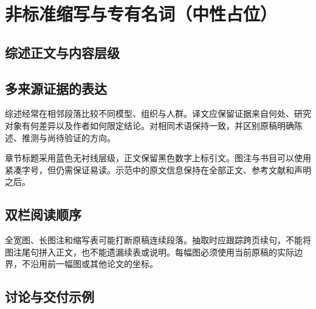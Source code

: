 \documentclass[UTF8,fontset=none,scheme=plain]{ctexart}
\begin{document}
\section*{非标准缩写与专有名词（中性占位）}
\begingroup\setlength{\fboxsep}{8bp}\setlength{\fboxrule}{.5bp}
\noindent{}\endgroup\par\vspace{12bp}
\begin{ahacols}
\section*{综述正文与内容层级}
\AhaBody
\subsection*{多来源证据的表达}
综述经常在相邻段落比较不同模型、组织与人群。译文应保留证据来自何处、研究对象有何差异以及作者如何限定结论。对相同术语保持一致，并区别原稿明确陈述、推测与尚待验证的方向。

章节标题采用蓝色无衬线层级，正文保留黑色数字上标引文。图注与书目可以使用紧凑字号，但仍需保证易读。示范中的原文信息保持在全部正文、参考文献和声明之后。
\subsection*{双栏阅读顺序}
全宽图、长图注和缩写表可能打断原稿连续段落。抽取时应跟踪跨页续句，不能将图注尾句拼入正文，也不能遗漏续表或说明。每幅图必须使用当前原稿的实际边界，不沿用前一幅图或其他论文的坐标。
\end{ahacols}

\clearpage
\AhaFigure
\begin{ahacols}
\section*{讨论与交付示例}
\AhaBody
\AhaBackmatter
\end{ahacols}
\end{document}
